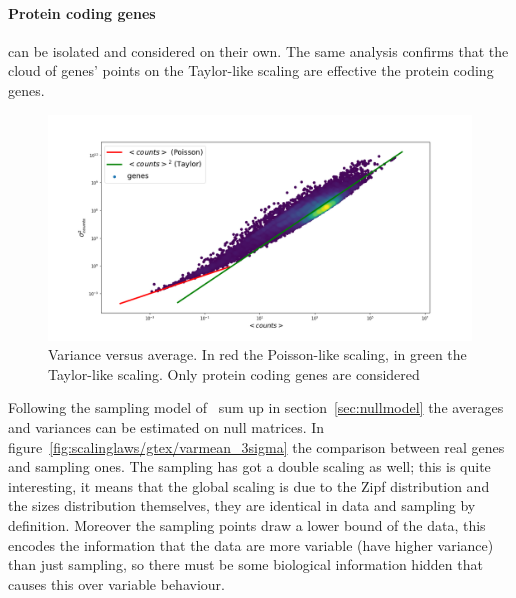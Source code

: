\paragraph{Protein coding genes} can be isolated and considered on their own. The same analysis confirms that the cloud of genes' points on the Taylor-like scaling are effective the protein coding genes.
\begin{figure}[htb!]
    \centering
    \includegraphics[width=0.9\linewidth]{pictures/scalinglaws/gtex/varmean_loglog_density.png}
    \caption{Variance versus average. In red the Poisson-like scaling, in green the Taylor-like scaling. Only protein coding genes are considered}
    \label{fig:scalinglaws/gtex/varmean_loglog_density}
\end{figure}
Following the sampling model of~\cite{Mazzolini2018} sum up in section~\ref{sec:nullmodel} the averages and variances can be estimated on null matrices. In figure~\ref{fig:scalinglaws/gtex/varmean_3sigma} the comparison between real genes and sampling ones. The sampling has got a double scaling as well; this is quite interesting, it means that the global scaling is due to the Zipf distribution and the sizes distribution themselves, they are identical in data and sampling by definition.
Moreover the sampling points draw a lower bound of the data, this encodes the information that the data are more variable (have higher variance) than just sampling, so there must be some biological information hidden that causes this over variable behaviour.
